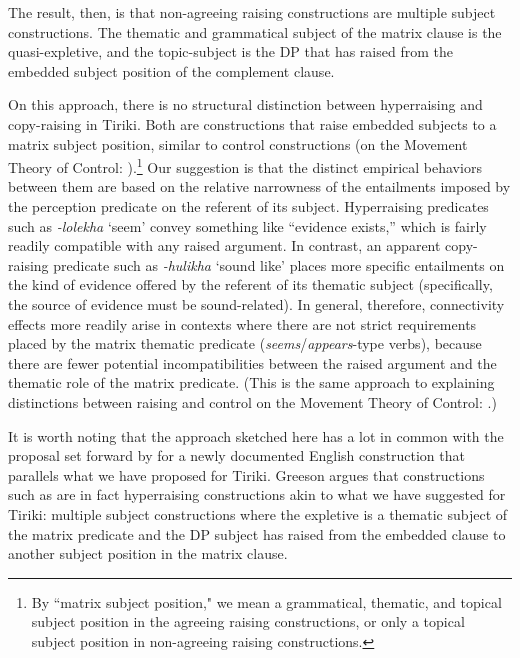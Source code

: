 \documentclass[output=paper,colorlinks,citecolor=brown
]{langscibook}
\begin{document}
\z

\noindent The result, then, is that non-agreeing raising constructions are multiple subject constructions. The thematic and grammatical subject of the matrix clause is the quasi-expletive, and the topic-subject is the DP that has raised from the embedded subject position of the complement clause.

On this approach, there is no structural distinction between hyperraising and copy-raising in Tiriki. Both are constructions that raise embedded subjects to a matrix subject position, similar to control constructions (on the Movement Theory of Control: \citealt{BoeckxHornsteinNunes:2010}).\footnote{By ``matrix subject position," we mean a grammatical, thematic, and topical subject position in the agreeing raising constructions, or only a topical subject position in non-agreeing raising constructions.} Our suggestion is that the distinct empirical behaviors between them are based on the relative narrowness of the entailments imposed by the perception predicate on the referent of its subject. Hyperraising predicates such as \textit{-lolekha} `seem' convey something like ``evidence exists,'' which is fairly readily compatible with any raised argument. In contrast, an apparent copy-raising predicate such as \textit{-hulikha} `sound like' places more specific entailments on the kind of evidence offered by the referent of its thematic subject (specifically, the source of evidence must be sound-related). In general, therefore, connectivity effects more readily arise in contexts where there are not strict requirements placed by the matrix thematic predicate (\textit{seems}/\textit{appears}-type verbs), because there are fewer potential incompatibilities between the raised argument and the thematic role of the matrix predicate. (This is the same approach to explaining distinctions between raising and control on the Movement Theory of Control: \citealt{BoeckxHornsteinNunes:2010}.)

It is worth noting that the approach sketched here has a lot in common with the proposal set forward by \citet{Greeson2023EnglishHr} for a newly documented English construction that parallels what we have proposed for Tiriki. Greeson argues that constructions such as  are in fact hyperraising constructions akin to what we have suggested for Tiriki: multiple subject constructions where the expletive is a thematic subject of the matrix predicate and the DP subject has raised from the embedded clause to another subject position in the matrix clause. 
\end{document}
